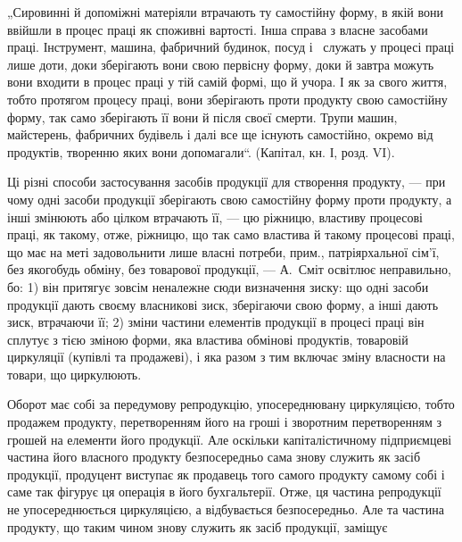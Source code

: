 „Сировинні й допоміжні матеріяли втрачають ту самостійну форму, в
якій вони ввійшли в процес праці як споживні вартості. Інша справа
з власне засобами праці. Інструмент, машина, фабричний будинок, посуд
і~ служать у процесі праці лише доти, доки зберігають вони
свою первісну форму, доки й завтра можуть вони входити в процес праці
у тій самій формі, що й учора. І як за свого життя, тобто протягом
процесу праці, вони зберігають проти продукту свою самостійну форму,
так само зберігають її вони й після своєї смерти. Трупи машин, майстерень,
фабричних будівель і далі все ще існують самостійно, окремо
від продуктів, творенню яких вони допомагали“. (Капітал, кн. І, розд. VI).

Ці різні способи застосування засобів продукції для створення продукту,
— при чому одні засоби продукції зберігають свою самостійну форму
проти продукту, а інші змінюють або цілком втрачають її, — цю ріжницю,
властиву процесові праці, як такому, отже, ріжницю, що так само
властива й такому процесові праці, що має на меті задовольнити лише
власні потреби, прим., патріярхальної сім’ї, без якогобудь обміну, без
товарової продукції, — А.~Сміт освітлює неправильно, бо: 1) він притягує
зовсім неналежне сюди визначення зиску: що одні засоби продукції дають
своєму власникові зиск, зберігаючи свою форму, а інші дають зиск,
втрачаючи її; 2) зміни частини елементів продукції в процесі праці він
сплутує з тією зміною форми, яка властива обмінові продуктів, товаровій
циркуляції (купівлі та продажеві), і яка разом з тим включає зміну
власности на товари, що циркулюють.

Оборот має собі за передумову репродукцію, упосереднювану циркуляцією,
тобто продажем продукту, перетворенням його на гроші і зворотним
перетворенням з грошей на елементи його продукції. Але оскільки
капіталістичному підприємцеві частина його власного продукту безпосередньо
сама знову служить як засіб продукції, продуцент виступає як
продавець того самого продукту самому собі і саме так фігурує ця операція
в його бухгальтерії. Отже, ця частина репродукції не упосереднюється
циркуляцією, а відбувається безпосередньо. Але та частина продукту,
що таким чином знову служить як засіб продукції, заміщує
\parbreak{}  %
